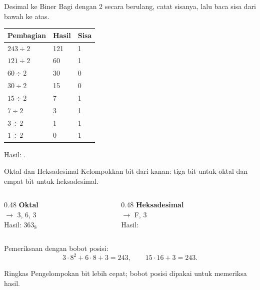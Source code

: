\documentclass[aspectratio=169,11pt]{beamer}
\begin{document}
\begin{frame}{Desimal ke Biner}
\small
Bagi dengan 2 secara berulang, catat sisanya, lalu baca sisa dari
bawah ke atas.

\vspace{0.2em}
\begin{center}
\begin{tabular}{@{}p{4.2cm}p{3.2cm}p{2.2cm}@{}}
    \toprule
    \textbf{Pembagian} & \textbf{Hasil} & \textbf{Sisa} \\
    \midrule
    $243 \div 2$ & 121 & 1 \\
    $121 \div 2$ & 60 & 1 \\
    $60 \div 2$ & 30 & 0 \\
    $30 \div 2$ & 15 & 0 \\
    $15 \div 2$ & 7 & 1 \\
    $7 \div 2$ & 3 & 1 \\
    $3 \div 2$ & 1 & 1 \\
    $1 \div 2$ & 0 & 1 \\
    \bottomrule
\end{tabular}
\end{center}

\vspace{0.1em}
{\small Hasil: .\par}
\end{frame}

\begin{frame}{Oktal dan Heksadesimal}
\small
Kelompokkan bit dari kanan: tiga bit untuk oktal dan empat bit untuk
heksadesimal.

\vspace{0.25em}
\begin{columns}[t]
\begin{column}{0.48\textwidth}
    {\color{obeTeal}\bfseries Oktal}\\[0.2em]
     $\rightarrow$ 3, 6, 3\\
    Hasil: $363_8$
\end{column}
\begin{column}{0.48\textwidth}
    {\color{obeTeal}\bfseries Heksadesimal}\\[0.2em]
     $\rightarrow$ F, 3\\
    Hasil: 
\end{column}
\end{columns}

\vspace{0.35em}
Pemeriksaan dengan bobot posisi:
\[
3\cdot8^2 + 6\cdot8 + 3 = 243,
\qquad
15\cdot16 + 3 = 243.
\]

\begin{block}{Ringkas}
\small Pengelompokan bit lebih cepat; bobot posisi dipakai untuk
memeriksa hasil.
\end{block}
\end{frame}
\end{document}
